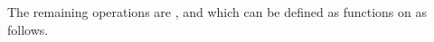 The remaining operations are ,  and  which
can be defined as functions on  as follows.
\begin{code}%
%
\>[2]\AgdaSpace{}%
\AgdaSymbol{:}\AgdaSpace{}%
\AgdaSpace{}%
\AgdaSpace{}%
\AgdaSymbol{(}\AgdaSpace{}%
\AgdaSymbol{)}\AgdaSpace{}%
\AgdaSpace{}%
\AgdaSpace{}%
\AgdaOperator{\AgdaDatatype{+}}\AgdaSpace{}%
\AgdaSpace{}%
\AgdaSpace{}%
\AgdaSpace{}%
\AgdaSpace{}%
\AgdaSpace{}%
\AgdaSpace{}%
\AgdaSymbol{(}\AgdaSpace{}%
\AgdaSymbol{)}\AgdaSpace{}%
\AgdaSpace{}%
\AgdaSpace{}%
\AgdaSpace{}%
\AgdaSpace{}%
\AgdaSpace{}%
\AgdaSpace{}%
\AgdaSpace{}%
\AgdaSpace{}%
\AgdaSymbol{(}\AgdaSpace{}%
\AgdaSymbol{)}\<%
\\
%
\>[2]\AgdaSpace{}%
\AgdaSpace{}%
\AgdaSpace{}%
\AgdaSpace{}%
\AgdaSpace{}%
\AgdaSymbol{=}\AgdaSpace{}%
\AgdaSpace{}%
\AgdaSpace{}%
\AgdaSpace{}%
\AgdaSpace{}%
\AgdaSpace{}%
\AgdaSpace{}%
\AgdaSpace{}%
\AgdaSymbol{(}\AgdaSpace{}%
\AgdaSymbol{)}\AgdaSpace{}%
\AgdaSpace{}%
\AgdaSpace{}%
\AgdaSpace{}%
\AgdaSpace{}%
\AgdaBound{\AgdaUnderscore{}}\AgdaSpace{}%
\AgdaSpace{}%
\AgdaSpace{}%
\AgdaSymbol{(}\AgdaSpace{}%
\AgdaSymbol{)}\AgdaSpace{}%
\AgdaSymbol{(}\AgdaSpace{}%
\AgdaSymbol{)}\<%
\\
%
\\[\AgdaEmptyExtraSkip]%
%
\>[2]%
\>[1897I]\AgdaSymbol{:}\AgdaSpace{}%
\AgdaSpace{}%
\AgdaOperator{\AgdaDatatype{+}}\AgdaSpace{}%
\AgdaSpace{}%
\AgdaSpace{}%
\AgdaSpace{}%
\AgdaSpace{}%

\end{code}
